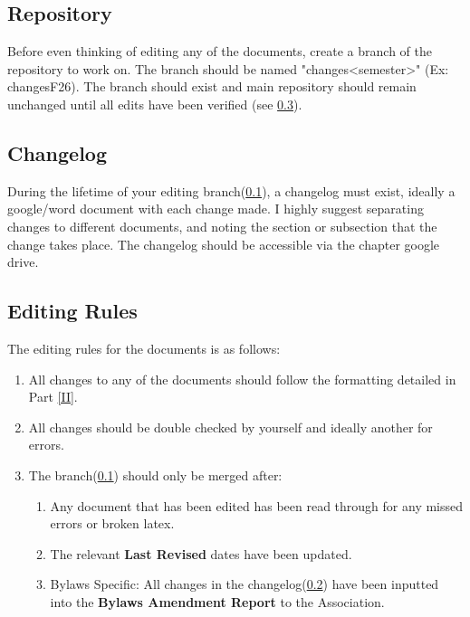 \subsection{Repository} \label{I.1}
Before even thinking of editing any of the documents, create a branch of the repository to work on. The branch should be named "changes<semester>" (Ex: changesF26).
The branch should exist and main repository should remain unchanged until all edits have been verified (see \ref{I.3}).

\subsection{Changelog} \label{I.2}
During the lifetime of your editing branch(\ref{I.1}), a changelog must exist, ideally a google/word document with each change made.
I highly suggest separating changes to different documents, and noting the section or subsection that the change takes place.
The changelog should be accessible via the chapter google drive.

\subsection{Editing Rules} \label{I.3}
The editing rules for the documents is as follows:

\begin{enumerate}
    \item {}
    All changes to any of the documents should follow the formatting detailed in Part \ref{II}. 
    \item {}
    All changes should be double checked by yourself and ideally another for errors.
    \item {}
    The branch(\ref{I.1}) should only be merged after:
    \begin{enumerate}
        \item Any document that has been edited has been read through for any missed errors or broken latex.
        \item The relevant \textbf{Last Revised} dates have been updated.
        \item Bylaws Specific: All changes in the changelog(\ref{I.2}) have been inputted into the \textbf{Bylaws Amendment Report} to the Association.
    \end{enumerate}
\end{enumerate}